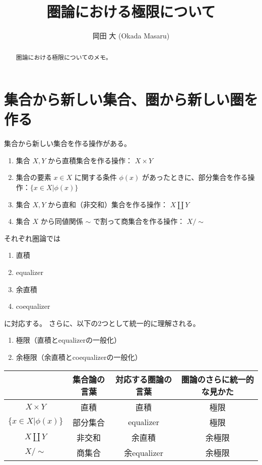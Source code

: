 \documentclass[uplatex,a4j,12pt,dvipdfmx]{jsarticle}
\title{
圏論における極限について
}
\author{
岡田 大 (Okada Masaru)
}
\begin{document}
\maketitle


\begin{abstract}
	圏論における極限についてのメモ。
\end{abstract}

\section{集合から新しい集合、圏から新しい圏を作る}

集合から新しい集合を作る操作がある。

\begin{enumerate}
	\item 集合 $X,Y$ から直積集合を作る操作： $X \times Y$
	\item 集合の要素 $x \in X$ に関する条件 $\phi(x)$ があったときに、部分集合を作る操作：$\{ x \in X | \phi(x) \}$
	\item 集合 $X,Y$ から直和（非交和）集合を作る操作： $X \coprod Y$
	\item 集合 $X$ から同値関係 $\sim$ で割って商集合を作る操作： $X / \sim$
\end{enumerate}

それぞれ圏論では

\begin{enumerate}
	\item 直積
	\item equalizer
	\item 余直積
	\item coequalizer
\end{enumerate}

に対応する。
さらに、以下の2つとして統一的に理解される。

\begin{enumerate}
	\item 極限（直積とequalizerの一般化）
	\item 余極限（余直積とcoequalizerの一般化）
\end{enumerate}


\begin{table}[H]
	\centering
	\begin{tabular}{c|c|c|c}
		                          & 集合論の言葉 & 対応する圏論の言葉  & 圏論のさらに統一的な見かた \\ \hline \hline
		$X \times Y$              & 直積     & 直積         & 極限            \\ \hline
		$\{ x \in X | \phi(x) \}$ & 部分集合   & equalizer  & 極限            \\ \hline
		$X \coprod Y$             & 非交和    & 余直積        & 余極限           \\ \hline
		$X / \sim$                & 商集合    & 余equalizer & 余極限           \\ \hline
	\end{tabular}
\end{table}
\end{document}
